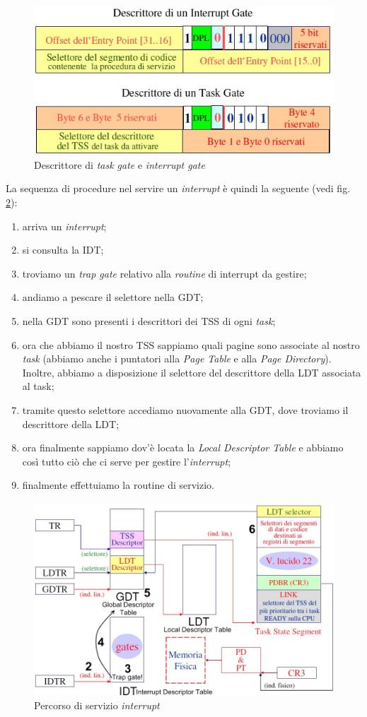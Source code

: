 \begin{figure}[!h]
\centering
\includegraphics[width=0.65\columnwidth]{img/intTaskGate}
\caption{Descrittore di \textit{task gate} e \textit{interrupt gate}}
\label{fig:intTaskGate}
\end{figure}

La sequenza di procedure nel servire un \textit{interrupt} è quindi la seguente (vedi fig. \ref{fig:percorso}):
\begin{enumerate}
\item arriva un \textit{interrupt};
\item si consulta la IDT;
\item troviamo un \textit{trap gate} relativo alla \textit{routine} di interrupt da gestire;
\item andiamo a pescare il selettore nella GDT;
\item nella GDT sono presenti i descrittori dei TSS di ogni \textit{task};
\item ora che abbiamo il nostro TSS sappiamo quali pagine sono associate al nostro \textit{task} (abbiamo anche i puntatori alla \textit{Page Table} e alla \textit{Page Directory}). Inoltre, abbiamo a disposizione il selettore del descrittore della LDT associata al task;
\item tramite questo selettore accediamo nuovamente alla GDT, dove troviamo il descrittore della LDT;
\item ora finalmente sappiamo dov'è locata la \textit{Local Descriptor Table} e abbiamo così tutto ciò che ci serve per gestire l'\textit{interrupt};
\item finalmente effettuiamo la routine di servizio.
\end{enumerate}

\begin{figure}[!h]
\centering
\includegraphics[width=0.93\columnwidth]{img/percorso}
\caption{Percorso di servizio \textit{interrupt}}
\label{fig:percorso}
\end{figure}

